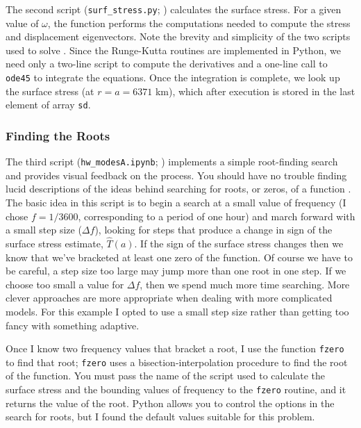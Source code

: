 \documentclass[11pt,titlepage,fleqn]{article}
\newcommand{\tfileA}{{\tt hw\_modesA.ipynb}}
\newcommand{\tfileB}{{\tt surf\_stress.py}}
\begin{document}
The second script (\tfileB; ) calculates the surface stress. For a given value of $\omega$, the function performs the computations needed to compute the stress and displacement eigenvectors. Note the brevity and simplicity of the two scripts used to solve . Since the Runge-Kutta routines are implemented in Python, we need only a two-line script to compute the derivatives and a one-line call to \verb+ode45+ to integrate the equations. Once the integration is complete, we look up the surface stress (at $r = a = 6371$ km), which after execution is stored in the last element of array \verb+sd+.

\subsubsection{Finding the Roots}

The third script (\tfileA; ) implements a simple root-finding search and provides visual feedback on the process. You should have no trouble finding lucid descriptions of the ideas behind searching for roots, or zeros, of a function \citep[\eg][]{Press1988}. The basic idea in this script is to begin a search at a small value of frequency (I chose $f = 1/3600$, corresponding to a period of one hour) and march forward with a small step size ($\Delta f$), looking for steps that produce a change in sign of the surface stress estimate, $\hat{T}(a)$. If the sign of the surface stress changes then we know that we’ve bracketed at least one zero of the function. Of course we have to be careful, a step size too large may jump more than one root in one step. If we choose too small a value for $\Delta f$, then we spend much more time searching. More clever approaches are more appropriate when dealing with more complicated models. For this example I opted to use a small step size rather than getting too fancy with something adaptive.

Once I know two frequency values that bracket a root, I use the function \verb+fzero+ to find that root; \verb+fzero+ uses a bisection-interpolation procedure to find the root of the function. You must pass the name of the script used to calculate the surface stress and the bounding values of frequency to the \verb+fzero+ routine, and it returns the value of the root. Python allows you to control the options in the search for roots, but I found the default values suitable for this problem.

\end{document}
